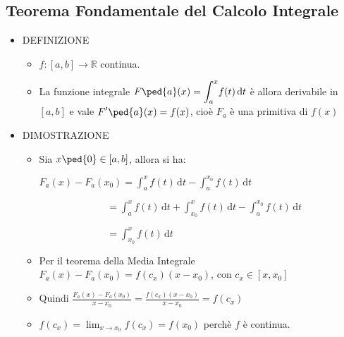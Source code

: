 \documentclass[10pt]{article}
\begin{document}
\begin{itemize}
\begin{itemize}
\subsection{Teorema Fondamentale del Calcolo Integrale}
\begin{itemize}
\item
DEFINIZIONE
\begin{itemize}
\item
$f:[a,b] \rightarrow \mathbb{R}  $ continua. 
\item 
La funzione integrale $F\ped{a}(x) = \displaystyle{\int_a^x \! f(t) \, \mathrm{d}t}$ è allora derivabile in $ [a,b] $ e vale $\displaystyle{F'\ped{a}(x) = f(x)}$, cioè $F_a$ è una primitiva di $f(x)$
\end{itemize}\medskip
\item
DIMOSTRAZIONE
\begin{itemize}
\item
Sia $x\ped{0} \in [a, b]$, allora si ha:
\begin{flushleft} 
$F_a(x) - F_a(x_0) = \displaystyle{\int_a^x \! f(t) \, \mathrm{d}t - \int_{a}^{x_0} f(t) \, \mathrm{d}t}$\smallskip \smallskip

$\qquad \qquad \qquad \; \; \; = \displaystyle{\int_a^x \! f(t) \, \mathrm{d}t + \int_{x_0}^{x} f(t) \, \mathrm{d}t - \int_a^{x_0} \! f(t) \, \mathrm{d}t}$\smallskip \smallskip

$\qquad \qquad \qquad \; \; \; = \displaystyle{\int_{x_0}^{x} f(t) \, \mathrm{d}t}$ \smallskip \smallskip
\end{flushleft}
\smallskip \smallskip \smallskip
\item
Per il teorema della Media Integrale $\displaystyle{F_a(x) - F_a(x_0) = f(c_x) (x-x_0)}$, con $c_x \in [x,x_0]$ \smallskip
\item
Quindi $\displaystyle{\frac{F_a(x) - F_a(x_0)}{x - x_0} = \frac{f(c_x)(x-x_0)}{x - x_0} = f(c_x)}$ \smallskip
\item
$f(c_x) = \displaystyle{\lim_{x \to x_0}{f(c_x)} = f(x_0)}$ perchè $f$ è continua.
\end{itemize}
\end{itemize}
\end{itemize}
\medskip

\end{itemize}
\end{document}
